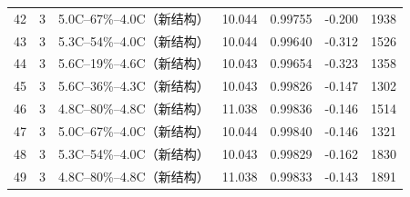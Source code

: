 \begin{longtable}{rrlrrrr}
42 & 3 & 5.0C--67\%--4.0C（新结构） & 10.044 & 0.99755 & -0.200 & 1938 \\
43 & 3 & 5.3C--54\%--4.0C（新结构） & 10.044 & 0.99640 & -0.312 & 1526 \\
44 & 3 & 5.6C--19\%--4.6C（新结构） & 10.043 & 0.99654 & -0.323 & 1358 \\
45 & 3 & 5.6C--36\%--4.3C（新结构） & 10.043 & 0.99826 & -0.147 & 1302 \\
46 & 3 & 4.8C--80\%--4.8C（新结构） & 11.038 & 0.99836 & -0.146 & 1514 \\
47 & 3 & 5.0C--67\%--4.0C（新结构） & 10.044 & 0.99840 & -0.146 & 1321 \\
48 & 3 & 5.3C--54\%--4.0C（新结构） & 10.043 & 0.99829 & -0.162 & 1830 \\
49 & 3 & 4.8C--80\%--4.8C（新结构） & 11.038 & 0.99833 & -0.143 & 1891 \\
\end{longtable}
